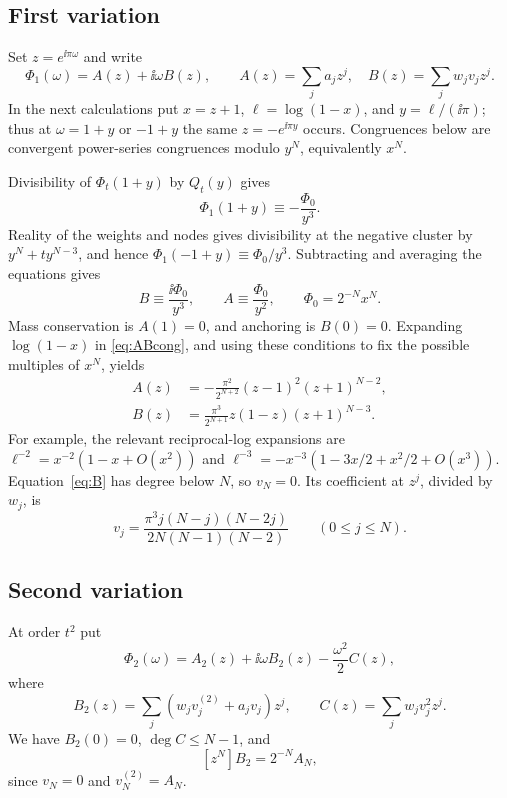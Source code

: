 \documentclass[11pt,a4paper]{article}
\theoremstyle{remark}\newtheorem{remark}[theorem]{Remark}
\begin{document}
\subsection{First variation}
Set $z=e^{\ii\pi\omega}$ and write
\[
 \Phi_1(\omega)=A(z)+\ii\omega B(z),\qquad
 A(z)=\sum_ja_jz^j,\quad B(z)=\sum_jw_jv_jz^j.
\]
In the next calculations put $x=z+1$, $\ell=\log(1-x)$, and $y=\ell/(\ii\pi)$; thus at $\omega=1+y$ or $-1+y$ the same $z=-e^{\ii\pi y}$ occurs. Congruences below are convergent power-series congruences modulo $y^N$, equivalently $x^N$.

Divisibility of $\Phi_t(1+y)$ by $Q_t(y)$ gives
\[
 \Phi_1(1+y)\equiv-\frac{\Phi_0}{y^3}.
\]
Reality of the weights and nodes gives divisibility at the negative cluster by $y^N+ty^{N-3}$, and hence
$\Phi_1(-1+y)\equiv\Phi_0/y^3$.
Subtracting and averaging the equations gives
\begin{equation}\label{eq:ABcong}
 B\equiv\frac{\ii\Phi_0}{y^3},\qquad
 A\equiv\frac{\Phi_0}{y^2},\qquad \Phi_0=2^{-N}x^N.
\end{equation}
Mass conservation is $A(1)=0$, and anchoring is $B(0)=0$. Expanding $\log(1-x)$ in \eqref{eq:ABcong}, and using these conditions to fix the possible multiples of $x^N$, yields
\begin{align}
 A(z)&=-\frac{\pi^2}{2^{N+2}}(z-1)^2(z+1)^{N-2},\label{eq:A}\\
 B(z)&=\frac{\pi^3}{2^{N+1}}z(1-z)(z+1)^{N-3}.\label{eq:B}
\end{align}
For example, the relevant reciprocal-log expansions are
$\ell^{-2}=x^{-2}(1-x+O(x^2))$ and
$\ell^{-3}=-x^{-3}(1-3x/2+x^2/2+O(x^3))$.
Equation~\eqref{eq:B} has degree below $N$, so $v_N=0$. Its coefficient at $z^j$, divided by $w_j$, is
\begin{equation}\label{eq:v}
 v_j=\frac{\pi^3j(N-j)(N-2j)}{2N(N-1)(N-2)}\qquad(0\le j\le N).
\end{equation}

\subsection{Second variation}
At order $t^2$ put
\[
 \Phi_2(\omega)=A_2(z)+\ii\omega B_2(z)-\frac{\omega^2}2 C(z),
\]
where
\[
 B_2(z)=\sum_j(w_jv_j^{(2)}+a_jv_j)z^j,\qquad
 C(z)=\sum_jw_jv_j^2z^j.
\]
We have $B_2(0)=0$, $\deg C\le N-1$, and
\begin{equation}\label{eq:lead}
 [z^N]B_2=2^{-N}A_N,
\end{equation}
since $v_N=0$ and $v_N^{(2)}=A_N$.
\end{document}
